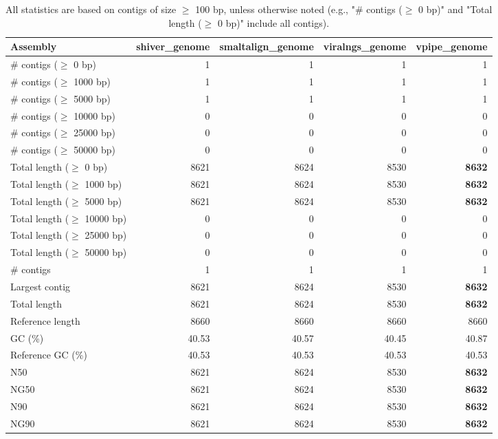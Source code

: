 \documentclass[12pt,a4paper]{article}
\begin{document}
\begin{table}[ht]
\begin{center}
\caption{All statistics are based on contigs of size $\geq$ 100 bp, unless otherwise noted (e.g., "\# contigs ($\geq$ 0 bp)" and "Total length ($\geq$ 0 bp)" include all contigs).}
\begin{tabular}{|l*{4}{|r}|}
\hline
Assembly & shiver\_genome & smaltalign\_genome & viralngs\_genome & vpipe\_genome \\ \hline
\# contigs ($\geq$ 0 bp) & 1 & 1 & 1 & 1 \\ \hline
\# contigs ($\geq$ 1000 bp) & 1 & 1 & 1 & 1 \\ \hline
\# contigs ($\geq$ 5000 bp) & 1 & 1 & 1 & 1 \\ \hline
\# contigs ($\geq$ 10000 bp) & 0 & 0 & 0 & 0 \\ \hline
\# contigs ($\geq$ 25000 bp) & 0 & 0 & 0 & 0 \\ \hline
\# contigs ($\geq$ 50000 bp) & 0 & 0 & 0 & 0 \\ \hline
Total length ($\geq$ 0 bp) & 8621 & 8624 & 8530 & {\bf 8632} \\ \hline
Total length ($\geq$ 1000 bp) & 8621 & 8624 & 8530 & {\bf 8632} \\ \hline
Total length ($\geq$ 5000 bp) & 8621 & 8624 & 8530 & {\bf 8632} \\ \hline
Total length ($\geq$ 10000 bp) & 0 & 0 & 0 & 0 \\ \hline
Total length ($\geq$ 25000 bp) & 0 & 0 & 0 & 0 \\ \hline
Total length ($\geq$ 50000 bp) & 0 & 0 & 0 & 0 \\ \hline
\# contigs & 1 & 1 & 1 & 1 \\ \hline
Largest contig & 8621 & 8624 & 8530 & {\bf 8632} \\ \hline
Total length & 8621 & 8624 & 8530 & {\bf 8632} \\ \hline
Reference length & 8660 & 8660 & 8660 & 8660 \\ \hline
GC (\%) & 40.53 & 40.57 & 40.45 & 40.87 \\ \hline
Reference GC (\%) & 40.53 & 40.53 & 40.53 & 40.53 \\ \hline
N50 & 8621 & 8624 & 8530 & {\bf 8632} \\ \hline
NG50 & 8621 & 8624 & 8530 & {\bf 8632} \\ \hline
N90 & 8621 & 8624 & 8530 & {\bf 8632} \\ \hline
NG90 & 8621 & 8624 & 8530 & {\bf 8632} \\ \hline

\end{tabular}
\end{center}
\end{table}
\end{document}
